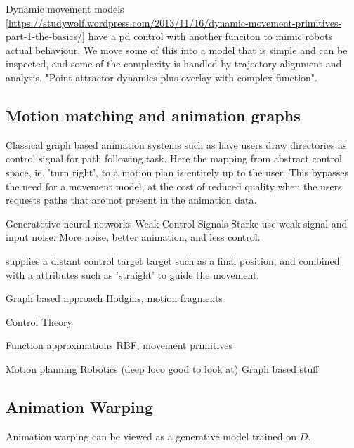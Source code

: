 Dynamic movement models \ref{https://studywolf.wordpress.com/2013/11/16/dynamic-movement-primitives-part-1-the-basics/} have a pd control with another funciton to mimic robots actual behaviour. We move some of this into a model that is simple and can be inspected, and some of the complexity is handled by trajectory alignment and analysis. "Point attractor dynamics plus overlay with complex function".

\subsection{Motion matching and animation graphs}
Classical graph based animation systems such as \citep{treuille07} have users draw directories as control signal for path following task. Here the mapping from abstract control space, ie. 'turn right', to a motion plan is entirely up to the user. This bypasses the need for a movement model, at the cost of reduced quality when the users requests paths that are not present in the animation data.



Generatetive neural networks Weak Control Signals
    Starke use weak signal and input noise. More noise, better animation, and less control.

    \citep{lee18} supplies a distant control target target such as a final position, and combined with a attributes such as 'straight' to guide the movement.

Graph based approach 
    Hodgins, motion fragments

Control Theory

Function approximations 
    RBF, movement primitives

Motion planning
    Robotics (deep loco good to look at)
    Graph based stuff



\subsection{Animation Warping}
Animation warping can be viewed as a generative model trained on $D$. 

